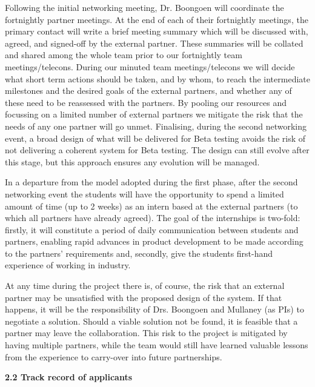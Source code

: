 \documentclass[11pt]{article}
\begin{document}
  \vspace{2mm}
  \noindent
  Following the initial networking meeting, Dr. Boongoen will coordinate the fortnightly partner meetings. At the end of each of their fortnightly meetings, the primary contact will write a brief meeting summary which will be discussed with, agreed, and signed-off by the external partner. These summaries will be collated and shared among the whole team prior to our fortnightly team meetings/telecons. During our minuted team meetings/telecons we will decide what short term actions should be taken, and by whom, to reach the intermediate milestones and the desired goals of the external partners, and whether any of these need to be reassessed with the partners. By pooling our resources and focussing on a limited number of external partners we mitigate the risk that the needs of any one partner will go unmet. Finalising, during the second networking event, a broad design of what will be delivered for Beta testing avoids the risk of not delivering a coherent system for Beta testing. The design can still evolve after this stage, but this approach ensures any evolution will be managed. 
  
  \vspace{2mm}
  \noindent
  In a departure from the model adopted during the first phase, after the second networking event the students will have the opportunity to spend a limited amount of time (up to 2 weeks) as an intern based at the external partners (to which all partners have already agreed). The goal of the internships is two-fold: firstly, it will constitute a period of daily communication between students and partners, enabling rapid advances in product development to be made according to the partners' requirements and, secondly, give the students first-hand experience of working in industry.

  \vspace{2mm}
  \noindent
  At any time during the project there is, of course, the risk that an external partner may be unsatisfied with the proposed design of the system. If that happens, it will be the responsibility of Drs. Boongoen and Mullaney (as PIs) to negotiate a solution. Should a viable solution not be found, it is feasible that a partner may leave the collaboration. This risk to the project is mitigated by having multiple partners, while the team would still have learned valuable lessons from the experience to carry-over into future partnerships.
    
  \pagebreak
  \noindent
  {\large \bf 2.2 Track record of applicants}
  
\end{document}
